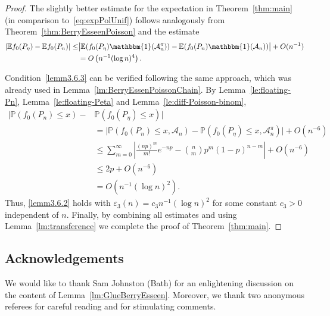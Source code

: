 \documentclass[AHL,Unicode,longabstracts,published]{cedram}
\newcommand{\ind}{\mathbbm{1}}
\newcommand{\bbE}{\mathbb{E}}
\newcommand{\bbP}{\mathbb{P}}
\newcommand{\clA}{\mathcal{A}}
\begin{document}
\begin{proof}
The slightly better estimate for the expectation in Theorem~\ref{thm:main} (in comparison to~\eqref{eq:expPolUnif}) follows analogously from Theorem~\ref{thm:BerryEsseenPoisson} and the estimate
\begin{align*}
| \bbE f_0(P_\eta) - \bbE f_0(P_n) |
\leq & \big| \bbE (f_0(P_\eta) \ind(\clA^\pi_n)) - \bbE (f_0(P_n) \ind(\clA_n)) \big| + O(n^{-1})
\\ & = O\left(n^{-1}(\log n)^4\right).
\end{align*}


Condition~\eqref{lemm3.6.3} can be verified following the same approach, which was already used in Lemma~\ref{lm:BerryEssenPoissonChain}. By Lemma~\ref{le:floating-Pn}, Lemma~\ref{le:floating-Peta} and Lemma~\ref{le:diff-Poisson-binom},
\begin{align*}
\big|\bbP(f_0(P_n)\leq x)- & \bbP(f_0(P_{\eta})\leq x)\big|
\\ &= \big|\bbP\left(f_0(P_n)\leq x, \clA_n\right)-\bbP\left(f_0(P_{\eta})\leq x, \clA_n^\pi\right)\big| + O(n^{-6})
\\ & \leq
\sum_{m=0}^\infty \left| \frac{(np)^m}{m!} e^{- np} - \binom{n}{m} p^m (1-p)^{n-m} \right| + O(n^{-6})
\\ & \leq 2p + O(n^{-6})\\
& = O\left(n^{-1} (\log n)^2\right).
\end{align*}
Thus, \eqref{lemm3.6.2} holds with $\varepsilon_3(n)=c_3 n^{-1} (\log n)^2$ for some constant $c_3>0$ independent of $n$. Finally, by combining all estimates and using Lemma~\ref{lm:transference} we complete the proof of Theorem~\ref{thm:main}.
\end{proof}


\subsection*{Acknowledgements}
We would like to thank Sam Johnston (Bath) for an enlightening discussion on the content of Lemma~\ref{lm:GlueBerryEsseen}. Moreover, we thank two anonymous referees for careful reading and for stimulating comments.



\end{document}
